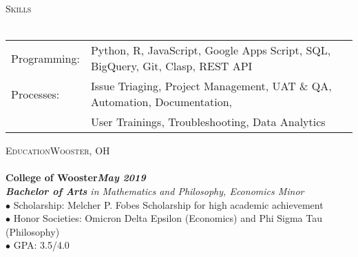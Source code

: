 \documentclass[a4paper]{article}
\newcommand{\lineunder} {
    \vspace*{-8pt} \\
    \hspace*{-18pt} \hrulefill \\
}
\newcommand{\header} [1] {
    {\hspace*{-18pt}\vspace*{6pt} \textsc{#1}}
    \vspace*{-6pt} \lineunder
}
\begin{document}
\header{Skills}
\begin{tabular}[leftmargin=-10pt,align=left]{ l l }
	\hspace*{-16pt}Programming:    &   Python, R, JavaScript, Google Apps Script, SQL, BigQuery, Git, Clasp, REST API\\
    \hspace*{-16pt}Processes:      &   Issue Triaging, Project Management, UAT \& QA, Automation, Documentation,\\ 
                    &   User Trainings, Troubleshooting,  Data Analytics
\end{tabular}
\vspace{2mm}

\header{Education\hfill Wooster, OH}
\hspace{-16pt}\textbf{College of Wooster}\hfill\textbf{\textit{May 2019}}\\
\hspace{-16pt}\textit{\textbf{Bachelor of Arts} in Mathematics and Philosophy, Economics Minor}\\
    $\bullet$ Scholarship: Melcher P. Fobes Scholarship for high academic achievement\\
    $\bullet$ Honor Societies: Omicron Delta Epsilon (Economics) and Phi Sigma Tau (Philosophy)\\
    $\bullet$ GPA: 3.5/4.0

\vspace*{2mm}
\end{document}
